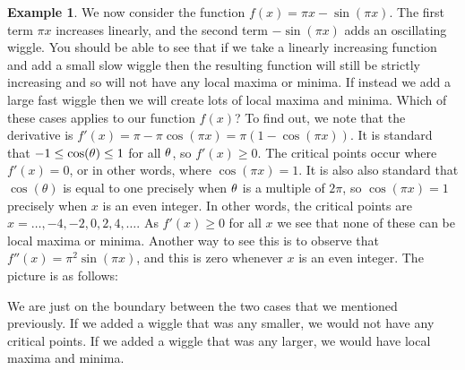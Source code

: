 \documentclass[reqno]{amsart}
\theoremstyle{definition}
\newtheorem{example}[theorem]{Example}
\begin{document}
\begin{example}
 We now consider the function $f(x)=\pi x-\sin(\pi x)$.  The first
 term $\pi x$ increases linearly, and the second term $-\sin(\pi x)$
 adds an oscillating wiggle.  You should be able to see that if we
 take a linearly increasing function and add a small slow wiggle then
 the resulting function will still be strictly increasing and so will
 not have any local maxima or minima.  If instead we add a large fast
 wiggle then we will create lots of local maxima and minima.  Which of
 these cases applies to our function $f(x)$?  To find out, we note
 that the derivative is $f'(x)=\pi-\pi\cos(\pi x)=\pi(1-\cos(\pi x))$.
 It is standard that $-1\leq\cos(\theta)\leq 1$ for all $\theta$, so
 $f'(x)\geq 0$.  The critical points occur where $f'(x)=0$, or in
 other words, where $\cos(\pi x)=1$.  It is also also standard that
 $\cos(\theta)$ is equal to one precisely when $\theta$ is a multiple of
 $2\pi$, so $\cos(\pi x)=1$ precisely when $x$ is an even integer.  In
 other words, the critical points are $x=\dotsc,-4,-2,0,2,4,\dotsc$.
 As $f'(x)\geq 0$ for all $x$ we see that none of these can be local
 maxima or minima.  Another way to see this is to observe that
 $f''(x)=\pi^2\sin(\pi x)$, and this is zero whenever $x$ is an even
 integer.  The picture is as follows:
 \begin{center}
 \end{center} 
 We are just on the boundary between the two cases that we mentioned
 previously.  If we added a wiggle that was any smaller, we would not
 have any critical points.  If we added a wiggle that was any larger,
 we would have local maxima and minima.
\end{example}
\end{document}
